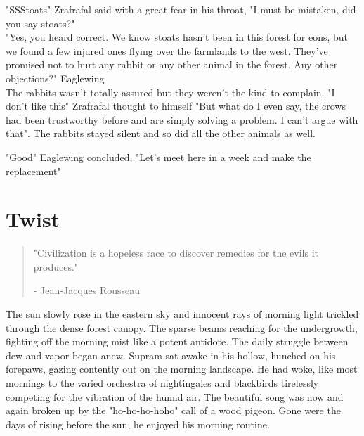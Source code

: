\documentclass[smalldemyvopaper,11pt,twoside,onecolumn,openright,extrafontsizes]{memoir}
\begin{document}
"SSStoats" Zrafrafal said with a great fear in his throat, "I must be mistaken, did you say stoats?"\\

"Yes, you heard correct. We know stoats hasn't been in this forest for eons, but we found a few injured ones flying over the farmlands to the west. They've promised not to hurt any rabbit or any other animal in the forest. Any other objections?" Eaglewing  \\

The rabbits wasn't totally assured but they weren't the kind to complain. "I don't like this" Zrafrafal thought to himself "But what do I even say, the crows had been trustworthy before and are simply solving a problem. I can't argue with that". The rabbits stayed silent and so did all the other animals as well.

"Good" Eaglewing concluded, "Let's meet here in a week and make the replacement"


\chapter{Twist}

\vspace{-1.3cm}
\begin{localsize}{10}
	\begin{quote}
		"Civilization is a hopeless race to discover remedies for the evils it produces."
		\begin{flushright}- Jean-Jacques Rousseau\end{flushright}
	\end{quote} 
\end{localsize}
\vspace{1cm}

The sun slowly rose in the eastern sky and innocent rays of morning light trickled through the dense forest canopy. The sparse beams reaching for the undergrowth, fighting off the morning mist like a potent antidote. The daily struggle between dew and vapor began anew. Supram sat awake in his hollow, hunched on his forepaws, gazing contently out on the morning landscape. He had woke, like most mornings to the varied orchestra of nightingales and blackbirds tirelessly competing for the vibration of the humid air. The beautiful song was now and again broken up by the "ho-ho-ho-hoho" call of a wood pigeon. Gone were the days of rising before the sun, he enjoyed his morning routine.
\end{document}
